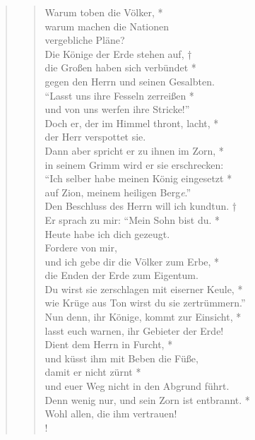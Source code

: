 \begin{quote}
\begin{verse}
Warum toben die Völker, *\\
warum machen die Nationen\\
vergebliche Pläne?\\
\vin Die Könige der Erde stehen auf, †\\ 
\vin die Großen haben sich verbündet *\\
\vin gegen den Herrn und seinen Gesalbten.\\
``Lasst uns ihre Fesseln zerreißen *\\
und von uns werfen ihre Stricke!'' \\
\vin Doch er, der im Himmel thront, lacht, *\\
\vin der Herr verspottet sie. \\
Dann aber spricht er zu ihnen im Zorn, *\\
in seinem Grimm wird er sie erschrecken: \\
\vin ``Ich selber habe meinen König eingesetzt *\\
\vin auf Zion, meinem heiligen Berg\textit{e}.''\\
Den Beschluss des Herrn will ich kundtun. †\\ 
Er sprach zu mir: ``Mein Sohn bist du. *\\
Heute habe ich dich gezeugt.\\
\vin Fordere von mir,\\
\vin und ich gebe dir die Völker zum Erbe, *\\
\vin die Enden der Erde zum Eigentum.\\
Du wirst sie zerschlagen mit eiserner Keule, *\\
wie Krüge aus Ton wirst du sie zertrümmern.''\\
\vin Nun denn, ihr Könige, kommt zur Einsicht, *\\
\vin lasst euch warnen, ihr Gebieter der Erde!\\
Dient dem Herrn in Furcht, *\\
und küsst ihm mit Beben die Füße,\\
\vin damit er nicht zürnt *\\
\vin und euer Weg nicht in den Abgrund führt.\\
Denn wenig nur, und sein Zorn ist entbrannt. *\\
Wohl allen, die ihm vertrauen!\\!

\end{verse}

\begin{verse}


\end{verse}
\end{quote}
